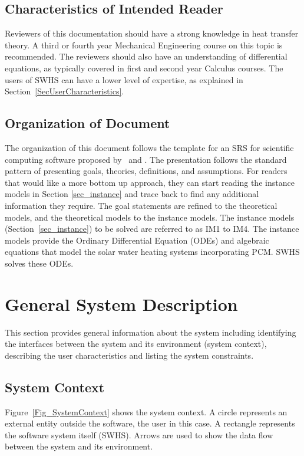 \documentclass[12pt]{article}
\newcommand{\progname}{SWHS}
\begin{document}
\subsection{Characteristics of Intended Reader} 

Reviewers of this documentation should have a strong knowledge in heat transfer
theory.  A third or fourth year Mechanical Engineering course on this topic is
recommended.  The reviewers should also have an understanding of differential
equations, as typically covered in first and second year Calculus courses.  The
users of \progname{} can have a lower level of expertise, as explained in
Section~\ref{SecUserCharacteristics}.

\subsection{Organization of Document}

The organization of this document follows the template for an SRS for scientific
computing software proposed by~\cite{Koothoor2013} and \cite{SmithAndLai2005}.
The presentation follows the standard pattern of presenting goals, theories,
definitions, and assumptions.  For readers that would like a more bottom up
approach, they can start reading the instance models in Section
\ref{sec_instance} and trace back to find any additional information they
require.  The goal statements are refined to the theoretical models, and the
theoretical models to the instance models. The instance models
(Section~\ref{sec_instance}) to be solved are referred to as IM1 to IM4. The
instance models provide the Ordinary Differential Equation (ODEs) and algebraic
equations that model the solar water heating systems incorporating PCM. SWHS
solves these ODEs.

\section{General System Description}

This section provides general information about the system including identifying 
the interfaces between the system and its environment (system context), describing 
the user characteristics and listing the system constraints.

\subsection{System Context}

Figure~\ref{Fig_SystemContext} shows the system context.  A circle represents an
external entity outside the software, the user in this case.  A rectangle
represents the software system itself (\progname{}).  Arrows are used to show the data
flow between the system and its environment.
\end{document}
